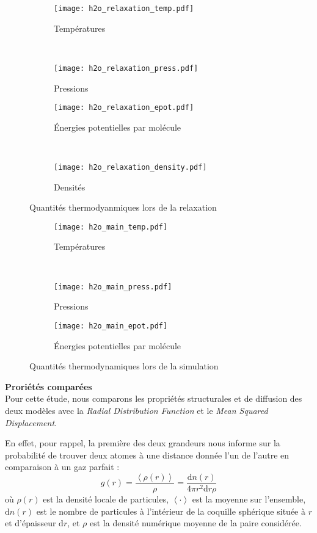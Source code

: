 \begin{figure}[h!]
    \centering
    \begin{subfigure}{.49\textwidth}
        \texttt{[image: h2o\_relaxation\_temp.pdf]}
        \caption{Températures}
    \end{subfigure}%
    ~
    \begin{subfigure}{.49\textwidth}
        \texttt{[image: h2o\_relaxation\_press.pdf]}
        \caption{Pressions}
    \end{subfigure}
    \begin{subfigure}{.49\textwidth}
        \texttt{[image: h2o\_relaxation\_epot.pdf]}
        \caption{Énergies potentielles par molécule}
    \end{subfigure}%
    ~
    \begin{subfigure}{.49\textwidth}
        \texttt{[image: h2o\_relaxation\_density.pdf]}
        \caption{Densités}
    \end{subfigure}
    \caption{Quantités thermodyanmiques lors de la relaxation}
    \label{fig:h2o_relaxation}
\end{figure}

\begin{figure}[h!]
    \centering
    \begin{subfigure}{.49\textwidth}
        \texttt{[image: h2o\_main\_temp.pdf]}
        \caption{Températures}
    \end{subfigure}%
    ~
    \begin{subfigure}{.49\textwidth}
        \texttt{[image: h2o\_main\_press.pdf]}
        \caption{Pressions}
    \end{subfigure}
    \begin{subfigure}{.49\textwidth}
        \texttt{[image: h2o\_main\_epot.pdf]}
        \caption{Énergies potentielles par molécule}
    \end{subfigure}
    \caption{Quantités thermodynamiques lors de la simulation}
    \label{fig:h2o_main}
\end{figure}

\textbf{Proriétés comparées}\\
Pour cette étude, nous comparons les propriétés structurales et de diffusion des deux modèles avec la \emph{Radial Distribution Function} et le \emph{Mean Squared Displacement}.

En effet, pour rappel, la première des deux grandeurs nous informe sur la probabilité de trouver deux atomes à une distance donnée l'un de l'autre en comparaison à un gaz parfait :
\begin{equation}
    \boxed%
    {
        g (r) = \frac{\left\langle \rho (r) \right\rangle}{\rho} = \frac{\mathrm{d}n(r)}{4 \pi r^2 \mathrm{d}r \rho}
    }
    \label{eq:rdf}
\end{equation}
où $\rho (r)$ est la densité locale de particules, $\left\langle \cdot \right\rangle$ est la moyenne sur l'ensemble, $\mathrm{d}n(r)$ est le nombre de particules à l'intérieur de la coquille sphérique située à $r$ et d'épaisseur $\mathrm{d}r$, et $\rho$ est la densité numérique moyenne de la paire considérée.

